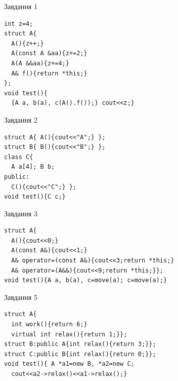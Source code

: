 \documentclass[12pt, ukrainian]{article}
\begin{document}
{{{{{{\begin{minipage}[t]{11cm}
{\begin{center}Завдання {1}\end{center}}
\vspace{-6mm}

\begin{verbatim}
int z=4;
struct A{
  A(){z++;}
  A(const A &aa){z+=2;}
  A(A &&aa){z+=4;}
  A& f(){return *this;}
};
void test(){
  {A a, b(a), c(A().f());} cout<<z;}
\end{verbatim}            


               
{\begin{center}Завдання {2}\end{center}}
\vspace{-6mm}

\begin{verbatim}
struct A{ A(){cout<<"A";} };
struct B{ B(){cout<<"B";} };
class C{
  A a[4]; B b;
public:
  C(){cout<<"C";} };
void test(){C c;}
\end{verbatim}            


               
{\begin{center}Завдання {3}\end{center}}
\vspace{-6mm}

\begin{verbatim}
struct A{
  A(){cout<<0;}
  A(const A&){cout<<1;}
  A& operator=(const A&){cout<<3;return *this;}
  A& operator=(A&&){cout<<9;return *this;}};
void test(){A a, b(a), c=move(a); c=move(a);}
\end{verbatim}            


               
{\begin{center}Завдання {5}\end{center}}
\vspace{-6mm}

\begin{verbatim}
struct A{
  int work(){return 6;}
  virtual int relax(){return 1;}};
struct B:public A{int relax(){return 3;}};
struct C:public B{int relax(){return 0;}};
void test(){ A *a1=new B, *a2=new C;
  cout<<a2->relax()<<a1->relax();}
\end{verbatim}            


\end{minipage}
\vline \hspace{8mm}
\begin{minipage}[t]{7cm}
               

\end{minipage}}}}}}}
\end{document}
